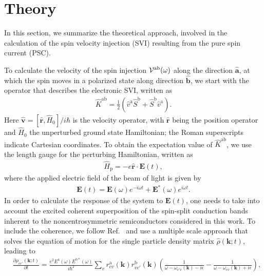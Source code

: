 \documentclass[floatfix,prb,aps,superscriptaddress,showpacs,11pt,preprint,letterpaper]{revtex4}
\begin{document}
\section{Theory}
\label{sec:theory}

In this section, we  summarize the theoretical approach, involved in the
calculation of the spin velocity injection (SVI) resulting from the pure spin
current (PSC).
 
To calculate the velocity of the spin injection ${\cal
V}^{\mathrm{a}\mathrm{b}}(\omega)$ along the direction $\hat{\mathbf{a}}$, at
which the spin moves in a polarized state along direction $\hat{\mathbf{b}}$,
we start with the operator that describes the electronic SVI, written as
\begin{align}\label{z.1}
\hat K^{\mathrm{a}\mathrm{b}} = 
\frac{1}{2}\left( \hat v^\mathrm{a} \hat S^\mathrm{b} 
+\hat  S^\mathrm{b} \hat v^\mathrm{a}\right) 
.
\end{align} 
Here $\hat{\mathbf v}=[\hat{\mathbf r},\hat H_0]/i\hbar$ 
is the velocity operator, with
$\hat {\mathbf r}$ 
being the position operator and $\hat H_0$ the unperturbed
ground state Hamiltonian; 
the Roman superscripts  indicate Cartesian coordinates. 
To obtain the expectation value of 
$\hat K^{\mathrm{a}\mathrm{b}}$, we use the length gauge for the perturbing
Hamiltonian, written as
\begin{align}\label{z.2}
\hat H_{\text{p}}=-e\hat{\mathbf r}\cdot{\mathbf E}(t)
,
\end{align}   
where the applied electric field of the beam of light is given by
\begin{align}\label{z.3}
{\mathbf E}(t) = 
{\mathbf E}(\omega)e^{-i\omega t} + {\mathbf E}^*(\omega)e^{i\omega t}
.
\end{align}
In order to calculate the response of the system to ${\mathbf E}(t)$, one needs
to take into account the excited coherent superposition of the spin-split
conduction bands inherent to the noncentrosymmetric semiconductors considered
in this work. 
To include the coherence, we follow Ref.~
and use a multiple scale approach that solves the equation of motion for the
single particle density matrix 
$\hat{\rho}({\mathbf k};t)$,  
leading to
\begin{align}\label{z.4}
&\frac{\partial \rho_{cc'}({\mathbf k;t})}{\partial t} =
\frac{e^{2}E^{\mathrm{a}}(\omega)E^{\mathrm{b*}}(\omega)}
{i \hbar^{2}}
\sum_{v}r^{\mathrm{a}}_{cv}({\mathbf k}) r^{\mathrm{b}}_{vc'}({\mathbf k})
\left( \frac{1}{\omega - \omega_{c'v}({\mathbf k}) - i \epsilon} 
- 
\frac{1}{\omega - \omega_{cv}({\mathbf k}) + i \epsilon} \right)
,
\end{align}
\end{document}
